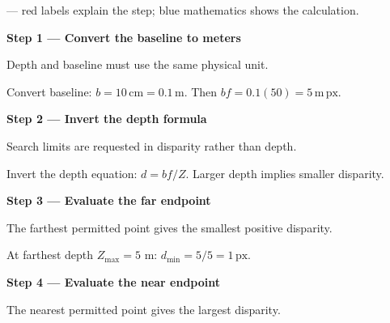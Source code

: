 \documentclass[letterpaper,11pt,english,openany,oneside]{jupyterBook}
\begin{document}
\par\medskip

\sphinxAtStartPar
{} — red labels explain the step; blue mathematics shows the calculation.

\par\medskip{}
{\color{QuizStepRed}\bfseries Step 1 — Convert the baseline to meters}\par\smallskip

\sphinxAtStartPar
{} Depth and baseline must use the same physical unit.

\sphinxAtStartPar
Convert baseline: {\color{QuizMathBlue} \(b=10\,\mathrm{cm}=0.1\,\mathrm m\)}. Then {\color{QuizMathBlue} \(bf=0.1(50)=5\,\mathrm{m\,px}\)}.

\par

\par\medskip{}
{\color{QuizStepRed}\bfseries Step 2 — Invert the depth formula}\par\smallskip

\sphinxAtStartPar
{} Search limits are requested in disparity rather than depth.

\sphinxAtStartPar
Invert the depth equation: {\color{QuizMathBlue} \(d=bf/Z\)}. Larger depth implies smaller disparity.

\par

\par\medskip{}
{\color{QuizStepRed}\bfseries Step 3 — Evaluate the far endpoint}\par\smallskip

\sphinxAtStartPar
{} The farthest permitted point gives the smallest positive disparity.

\sphinxAtStartPar
At farthest depth {\color{QuizMathBlue} \(Z_{\max}=5\)} m: {\color{QuizMathBlue} \(d_{\min}=5/5=\boxed{1\,\mathrm{px}}\)}.

\par

\par\medskip{}
{\color{QuizStepRed}\bfseries Step 4 — Evaluate the near endpoint}\par\smallskip

\sphinxAtStartPar
{} The nearest permitted point gives the largest disparity.
\end{document}
